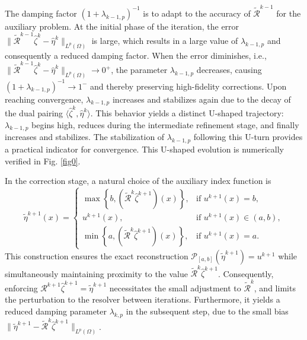 \documentclass[onefignum,onetabnum]{siamart190516}
\numberwithin{equation}{section}
\begin{document}
The damping factor $({1+\lambda_{k-1,p}})^{-1}$ is to adapt to the accuracy of $\widetilde{\mathcal{R}}^{k-1}$ for the auxiliary problem.
At the initial phase of the iteration, the error $\|\widetilde{\mathcal{R}}^{k-1}\hat{\zeta}^{k} - \hat{\eta}^{k}\|_{L^{p}(\Omega)}$ is large, which results in a large value of $\lambda_{k-1,p}$ and consequently a reduced damping factor.
When the error diminishes, i.e., $\|\widetilde{\mathcal{R}}^{k-1}\hat{\zeta}^{k} - \hat{\eta}^{k}\|_{L^{p}(\Omega)} \to 0^{+}$, the parameter $\lambda_{k-1,p}$ decreases, causing $(1+\lambda_{k-1,p})^{-1} \to 1^{-}$ and thereby preserving high-fidelity corrections.
Upon reaching convergence, $\lambda_{k-1,p}$ increases and stabilizes again due to the decay of the dual pairing $\langle \hat{\zeta}^{k}, \hat{\eta}^{k} \rangle$.
This behavior yields a distinct U-shaped trajectory: $\lambda_{k-1,p}$ begins high, reduces during the intermediate refinement stage, and finally increases and stabilizes.
The stabilization of $\lambda_{k-1,p}$ following this U-turn provides a practical indicator for convergence.
This U-shaped evolution is numerically verified in Fig. \ref{fig0}.

In the correction stage, a natural choice of the auxiliary index function is
\begin{equation}\label{eqn30}
\tilde{\eta}^{k+1}(x) = \begin{cases}
\max\left\{ b, \left( \widetilde{\mathcal{R}}^{k}\hat{\zeta}^{k+1} \right)(x) \right\}, & \text{if } u^{k+1}(x) = b, \\
u^{k+1}(x), & \text{if } u^{k+1}(x) \in (a,b), \\
\min\left\{ a, \left( \widetilde{\mathcal{R}}^{k}\hat{\zeta}^{k+1} \right)(x) \right\}, & \text{if } u^{k+1}(x) = a.
\end{cases}
\end{equation}
This construction ensures the exact reconstruction $\mathcal{P}_{[a,b]}(\tilde{\eta}^{k+1}) = u^{k+1}$ while simultaneously maintaining proximity to the value $\widetilde{\mathcal{R}}^{k}\hat{\zeta}^{k+1}$.
Consequently, enforcing $\mathcal{R}^{k+1}\hat{\zeta}^{k+1} = \tilde{\eta}^{k+1}$ necessitates the small adjustment to $\widetilde{\mathcal{R}}^{k}$, and limits the perturbation to the resolver between iterations.
Furthermore, it yields a reduced damping parameter $\lambda_{k,p}$ in the subsequent step, due to the small bias $\|\tilde{\eta}^{k+1}-\widetilde{\mathcal{R}}^{k}\hat{\zeta}^{k+1}\|_{L^{p}(\Omega)}$.
\end{document}
